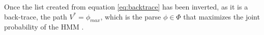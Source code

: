 Once the list created from equation \ref{eq:backtrace} has been inverted, as it is a back-trace, the path $V^* = \phi_{max}$, which is the parse $\phi \in \Phi$ that maximizes the joint probability of the HMM \cite{Rabiner1989ARecognition}. 


\begin{singlespace}
\printbibliography[heading=bibintoc,title={References}]
\end{singlespace}